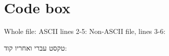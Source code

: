 \documentclass{closettwin}
\begin{document}
\mainmatter
\chapter{Code box}
Whole file:
ASCII lines 2-5:
Non-ASCII file, lines 3-6:
\begin{hebrewpage}[בדיקה]
טקסט עברי ואחריו קוד:
\end{hebrewpage}
\end{document}
